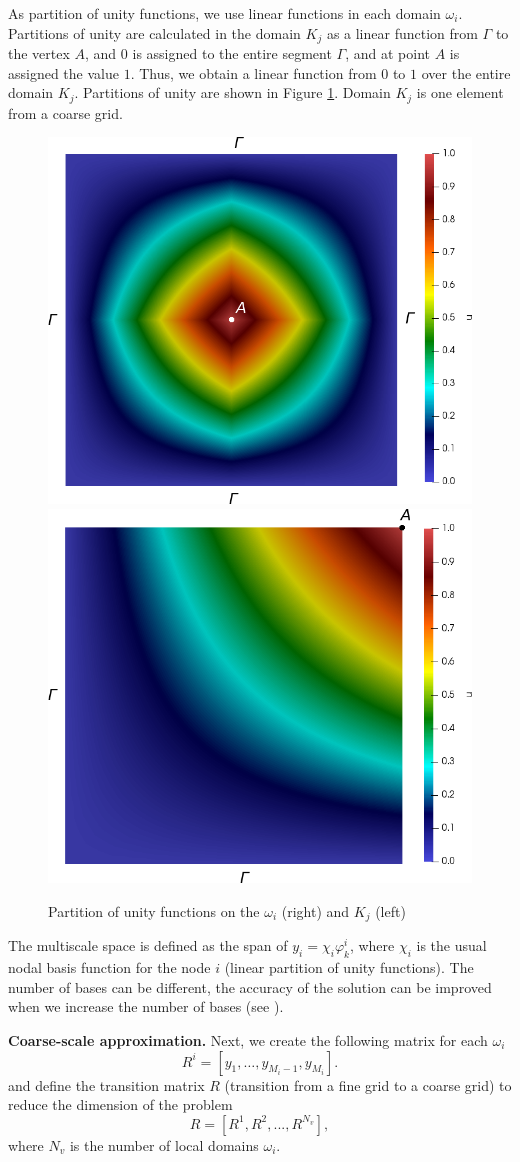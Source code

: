 \documentclass[10pt]{article}
\begin{document}
As partition of unity functions, we use linear functions in each domain $\omega_i$.
Partitions of unity are calculated in the domain $K_j$ as a linear function from $\Gamma$ to the vertex $A$, and $0$ is assigned to the entire segment $\Gamma$, and at point $A$ is assigned the value $1$.
Thus, we obtain a linear function from $0$ to $1$ over the entire domain $K_j$.
Partitions of unity are shown in Figure \ref{p2}.
Domain $K_j$ is one element from a coarse grid.
\begin{figure}[h!]
	\centering
		\includegraphics[width=0.45\linewidth]{pofs.png} \hspace{2em}
		\includegraphics[width=0.45\linewidth]{pouK.png}
	\caption{Partition of unity functions on the $\omega_i$ (right) and $K_j$ (left)}
	\label{p2}
\end{figure}
 
The multiscale space is defined as the span of $y_i = \chi_i \varphi^i_k$, where $\chi_i$ is the usual nodal basis function for the node $i$ (linear partition of unity functions).
The number of bases can be different, the accuracy of the solution can be improved when we increase the number of bases (see \cite{Efendiev2009}).

\textbf{Coarse-scale approximation. }
Next, we create the following matrix for each $\omega_i$
\[
	R^i = \left[ y_1, \ldots, y_{M_i - 1},  y_{M_i} \right].
\]
and define the transition matrix $R$ (transition from a fine grid to a coarse grid) to reduce the dimension of the problem
\[
	R = [ R^1, R^2, ..., R^{N_v} ],
\]
where $N_v$ is the number of local domains $\omega_i$.
\end{document}

